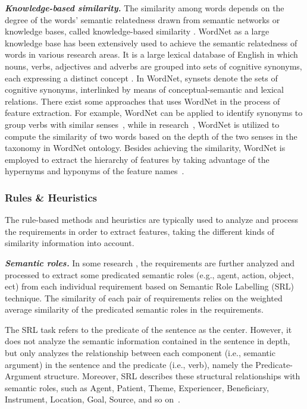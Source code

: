 \documentclass[graybox]{svmult}
\begin{document}
\textit{\textbf{Knowledge-based similarity.}}
The similarity among words depends on the degree of the words' semantic relatedness drawn from semantic networks or knowledge bases, called knowledge-based similarity \cite{MihalceaCS06}. WordNet as a large knowledge base has been extensively used to achieve the semantic relatedness of words in various research areas. It is a large lexical database of English in which nouns, verbs, adjectives and adverbs are grouped into sets of cognitive synonyms, each expressing a distinct concept \cite{Miller95}. In WordNet, synsets denote the sets of cognitive synonyms, interlinked by means of conceptual-semantic and lexical relations. There exist some approaches that uses WordNet in the process of feature extraction. For example, WordNet can be applied to identify synonyms to group verbs with similar senses~\cite{Wang15,Wang16}, while in research~\cite{ItzikR14,ItzikRBW16}, WordNet is utilized to compute the similarity of two words based on the depth of the two senses in the taxonomy in WordNet ontology. 
Besides achieving the similarity, WordNet is employed to extract the hierarchy of features by taking advantage of the hypernyms and hyponyms of the feature names~\cite{MeftehBB16}.


\subsubsection{Rules \& Heuristics}
The rule-based methods and heuristics are typically used to analyze and process the requirements in order to extract features, taking the different kinds of similarity information into account.

\textit{\textbf{Semantic roles.}} 
In some research \cite{ItzikR14,ReinhartzIW14}, the requirements are further analyzed and processed to extract some predicated semantic roles (e.g., agent, action, object, ect) from each individual requirement based on Semantic Role Labelling (SRL) technique. The similarity of each pair of requirements relies on the weighted average similarity of the predicated semantic roles in the requirements.

The SRL task refers to the predicate of the sentence as the center. 
However, it does not analyze the semantic information contained in the sentence in depth, but only analyzes the relationship between each component (i.e., semantic argument) in the sentence and the predicate (i.e., verb), namely the Predicate-Argument structure. 
Moreover, SRL describes these structural relationships with semantic roles, such as Agent, Patient, Theme, Experiencer, Beneficiary, Instrument, Location, Goal, Source, and so on~\cite{PalmerGK05}.
\end{document}
